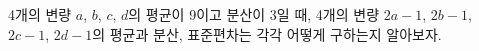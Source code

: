 4개의 변량 $a$, $b$, $c$, $d$의 평균이 9이고 분산이 3일 때, 4개의 변량 $2a-1$, $2b-1$, $2c-1$, $2d-1$의 평균과 분산, 표준편차는 각각 어떻게 구하는지 알아보자.
